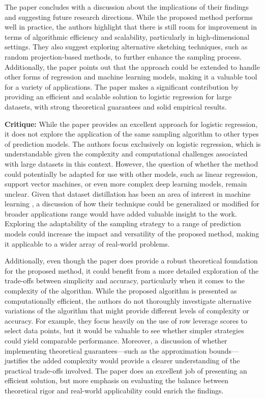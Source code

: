 \documentclass{article}
\theoremstyle{plain}
\theoremstyle{definition}
\theoremstyle{remark}
\begin{document}
The paper concludes with a discussion about the implications of their findings and suggesting future research directions. While the proposed method performs well in practice, the authors highlight that there is still room for improvement in terms of algorithmic efficiency and scalability, particularly in high-dimensional settings. They also suggest exploring alternative sketching techniques, such as random projection-based methods, to further enhance the sampling process. Additionally, the paper points out that the approach could be extended to handle other forms of regression and machine learning models, making it a valuable tool for a variety of applications. The paper makes a significant contribution by providing an efficient and scalable solution to logistic regression for large datasets, with strong theoretical guarantees and solid empirical results.



\textbf{Critique:} While the paper provides an excellent approach for logistic regression, it does not explore the application of the same sampling algorithm to other types of prediction models. The authors focus exclusively on logistic regression, which is understandable given the complexity and computational challenges associated with large datasets in this context. However, the question of whether the method could potentially be adapted for use with other models, such as linear regression, support vector machines, or even more complex deep learning models, remain unclear. Given that dataset distillation has been an area of interest in machine learning \cite{liu23}, a discussion of how their technique could be generalized or modified for broader applications range would have added valuable insight to the work. Exploring the adaptability of the sampling strategy to a range of prediction models could increase the impact and versatility of the proposed method, making it applicable to a wider array of real-world problems.

Additionally, even though the paper does provide a robust theoretical foundation for the proposed method, it could benefit from a more detailed exploration of the trade-offs between simplicity and accuracy, particularly when it comes to the complexity of the algorithm. While the proposed algorithm is presented as computationally efficient, the authors do not thoroughly investigate alternative variations of the algorithm that might provide different levels of complexity or accuracy. For example, they focus heavily on the use of row leverage scores to select data points, but it would be valuable to see whether simpler strategies could yield comparable performance. Moreover, a discussion of whether implementing theoretical guarantees—such as the approximation bounds—justifies the added complexity would provide a clearer understanding of the practical trade-offs involved. The paper does an excellent job of presenting an efficient solution, but more emphasis on evaluating the balance between theoretical rigor and real-world applicability could enrich the findings.
\end{document}
